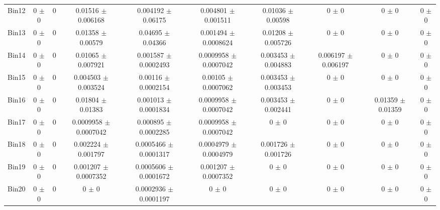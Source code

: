 \begin{tabular}{@{\extracolsep{4pt}}lccccccccc@{}}
     Bin12 & 0 $\pm$ 0 & 0 & 0.01516 $\pm$ 0.006168 & 0.004192 $\pm$ 0.06175 & 0.004801 $\pm$ 0.001511 & 0.01036 $\pm$ 0.00598 & 0 $\pm$ 0 & 0 $\pm$ 0 & 0 $\pm$ 0 \\ 
     Bin13 & 0 $\pm$ 0 & 0 & 0.01358 $\pm$ 0.00579 & 0.04695 $\pm$ 0.04366 & 0.001494 $\pm$ 0.0008624 & 0.01208 $\pm$ 0.005726 & 0 $\pm$ 0 & 0 $\pm$ 0 & 0 $\pm$ 0 \\ 
     Bin14 & 0 $\pm$ 0 & 0 & 0.01065 $\pm$ 0.007921 & 0.001587 $\pm$ 0.0002493 & 0.0009958 $\pm$ 0.0007042 & 0.003453 $\pm$ 0.004883 & 0.006197 $\pm$ 0.006197 & 0 $\pm$ 0 & 0 $\pm$ 0 \\ 
     Bin15 & 0 $\pm$ 0 & 0 & 0.004503 $\pm$ 0.003524 & 0.00116 $\pm$ 0.0002154 & 0.00105 $\pm$ 0.0007062 & 0.003453 $\pm$ 0.003453 & 0 $\pm$ 0 & 0 $\pm$ 0 & 0 $\pm$ 0 \\ 
     Bin16 & 0 $\pm$ 0 & 0 & 0.01804 $\pm$ 0.01383 & 0.001013 $\pm$ 0.0001834 & 0.0009958 $\pm$ 0.0007042 & 0.003453 $\pm$ 0.002441 & 0 $\pm$ 0 & 0.01359 $\pm$ 0.01359 & 0 $\pm$ 0 \\ 
     Bin17 & 0 $\pm$ 0 & 0 & 0.0009958 $\pm$ 0.0007042 & 0.000895 $\pm$ 0.0002285 & 0.0009958 $\pm$ 0.0007042 & 0 $\pm$ 0 & 0 $\pm$ 0 & 0 $\pm$ 0 & 0 $\pm$ 0 \\ 
     Bin18 & 0 $\pm$ 0 & 0 & 0.002224 $\pm$ 0.001797 & 0.0005466 $\pm$ 0.0001317 & 0.0004979 $\pm$ 0.0004979 & 0.001726 $\pm$ 0.001726 & 0 $\pm$ 0 & 0 $\pm$ 0 & 0 $\pm$ 0 \\ 
     Bin19 & 0 $\pm$ 0 & 0 & 0.001207 $\pm$ 0.0007352 & 0.0005606 $\pm$ 0.0001672 & 0.001207 $\pm$ 0.0007352 & 0 $\pm$ 0 & 0 $\pm$ 0 & 0 $\pm$ 0 & 0 $\pm$ 0 \\ 
     Bin20 & 0 $\pm$ 0 & 0 & 0 $\pm$ 0 & 0.0002936 $\pm$ 0.0001197 & 0 $\pm$ 0 & 0 $\pm$ 0 & 0 $\pm$ 0 & 0 $\pm$ 0 & 0 $\pm$ 0 \\ 
\hline\hline
  \end{tabular}
